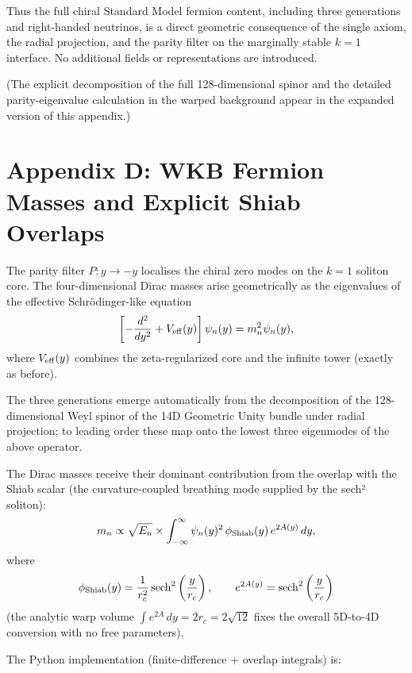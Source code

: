 \documentclass[11pt,a4paper,oneside]{article}
\newcommand{\sech}{\operatorname{sech}}
\begin{document}
Thus the full chiral Standard Model fermion content, including three generations and right-handed neutrinos, is a direct geometric consequence of the single axiom, the radial projection, and the parity filter on the marginally stable \(k=1\) interface. No additional fields or representations are introduced.

(The explicit decomposition of the full 128-dimensional spinor and the detailed parity-eigenvalue calculation in the warped background appear in the expanded version of this appendix.)

\section{Appendix D: WKB Fermion Masses and Explicit Shiab Overlaps}
\label{app:wkb}

The parity filter \(P: y \to -y\) localises the chiral zero modes on the \(k=1\) soliton core. The four-dimensional Dirac masses arise geometrically as the eigenvalues of the effective Schrödinger-like equation
\[
\left[ -\frac{d^2}{dy^2} + V_{\rm eff}(y) \right] \psi_n(y) = m_n^2 \psi_n(y),
\]
where \(V_{\rm eff}(y)\) combines the zeta-regularized core and the infinite tower (exactly as before).

The three generations emerge automatically from the decomposition of the 128-dimensional Weyl spinor of the 14D Geometric Unity bundle under radial projection; to leading order these map onto the lowest three eigenmodes of the above operator.

The Dirac masses receive their dominant contribution from the overlap with the Shiab scalar (the curvature-coupled breathing mode supplied by the sech² soliton):
\[
m_{n} \propto \sqrt{E_n} \times \int_{-\infty}^{\infty} \psi_n(y)^2 \,\phi_{\rm Shiab}(y)\, e^{2A(y)}\, dy,
\]
where
\[
\phi_{\rm Shiab}(y) = \frac{1}{r_c^2}\sech^2\left(\frac{y}{r_c}\right), \qquad
e^{2A(y)} = \sech^2\left(\frac{y}{r_c}\right)
\]
(the analytic warp volume \(\int e^{2A}\,dy = 2r_c = 2\sqrt{12}\) fixes the overall 5D-to-4D conversion with no free parameters).

The Python implementation (finite-difference + overlap integrals) is:
\end{document}

